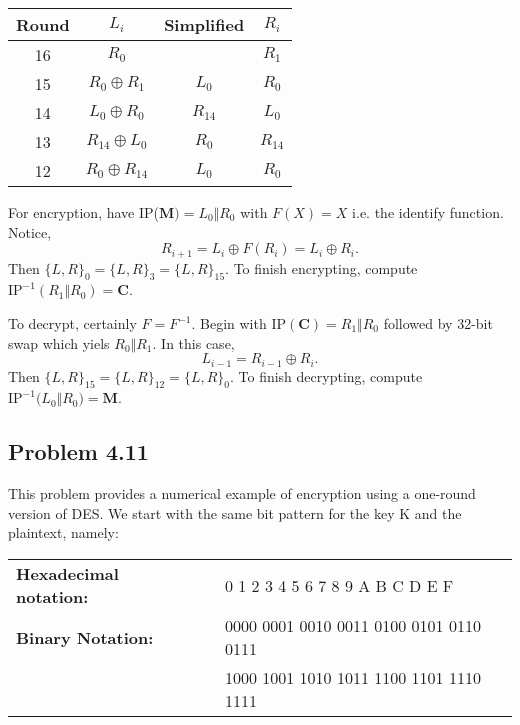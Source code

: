 \documentclass[../hw_sols.tex]{subfiles}
\begin{document}
\begin{description}
\begin{solution}
\begin{multicols}{2}
\begin{center}
	\begin{tabular}{ c | c | c | c }
		\textbf{Round} & $L_i$ & Simplified & $R_i$ \\[2pt]   %
		\hline
		16 &               $R_0$ &          & $R_1$    \\[5pt]
		15 &    $R_0 \oplus R_1$ &    $L_0$ & $R_0$    \\[5pt]
		14 &    $L_0 \oplus R_0$ & $R_{14}$ & $L_0$    \\[5pt]
		13 & $R_{14} \oplus L_0$ &    $R_0$ & $R_{14}$ \\[5pt]
		12 & $R_0 \oplus R_{14}$ &    $L_0$ & $R_0$
	\end{tabular}
\end{center}
\end{multicols}

For encryption, have IP($\mathbf{M}) = L_0 \Vert R_0$ with $F(X) = X$ i.e. the identify function. Notice,
	$$R_{i+1} = L_i \oplus F(R_i) = L_i \oplus R_i.$$
Then $\{L,R\}_0 = \{L,R\}_3 = \{L,R\}_{15}$. To finish encrypting, compute
$\text{IP}^{-1}(R_1 \Vert R_0) = \mathbf{C}$.

To decrypt, certainly $F = F^{-1}$. Begin with $\text{IP}(\mathbf{C}) = R_1 \Vert R_0$ followed by 32-bit swap which yiels $R_0 \Vert R_1$. In this case,
	$$L_{i-1} = R_{i-1} \oplus R_i.$$
Then $\{L,R\}_{15} = \{L,R\}_{12} = \{L,R\}_{0}$. To finish decrypting, compute
$\text{IP}^{-1}\big( L_0 \Vert R_0 \big) = \textbf{M}$.
\end{solution}

\end{description}


\newpage



\subsection*{Problem 4.11}
This problem provides a numerical example of encryption using a one-round version of DES. We start with the same bit pattern for the key K and the plaintext, namely:

\begin{center}
\begin{tabular} { l c l }
	\textbf{Hexadecimal notation:} & \qquad & 0 1 2 3 4 5 6 7 8 9 A B C D E F \\
	\textbf{Binary Notation:} & \qquad & 0000 0001 0010 0011 0100 0101 0110 0111 \\
	& \qquad & 1000 1001 1010 1011 1100 1101 1110 1111
\end{tabular}
\end{center}
\end{document}
